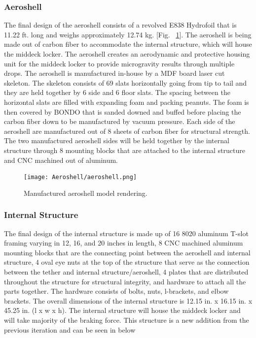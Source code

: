 \subsubsection{Aeroshell}

\indent\indent The final design of the aeroshell consists of a revolved E838 Hydrofoil that is 11.22 ft. long and weighs approximately 12.74 kg. [Fig. ~\ref{fig:aeroshell}]. The aeroshell is being made out of carbon fiber to accommodate the internal structure, which will house the middeck locker. The aeroshell creates an aerodynamic and protective housing unit for the middeck locker to provide microgravity results through multiple drops. The aeroshell is manufactured in-house by a MDF board laser cut skeleton. The skeleton consists of 69 slats horizontally going from tip to tail and they are held together by 6 side and 6 floor slats. The spacing between the horizontal slats are filled with expanding foam and packing peanuts. The foam is then covered by BONDO that is sanded downed and buffed before placing the carbon fiber down to be manufactured by vacuum pressure. Each side of the aeroshell are manufactured out of 8 sheets of carbon fiber for structural strength. The two manufactured aeroshell sides will be held together by the internal structure through 8 mounting blocks that are attached to the internal structure and CNC machined out of aluminum.

\begin{figure}[H]
  \centering
  \texttt{[image: Aeroshell/aeroshell.png]}
  \caption{\label{fig:aeroshell}Manufactured aeroshell model rendering.}
\end{figure}

\subsubsection{Internal Structure}

The final design of the internal structure is made up of 16 8020 aluminum T-slot framing varying in 12, 16, and 20 inches in length, 8 CNC machined aluminum mounting blocks that are the connecting point between the aeroshell and internal structure, 4 oval eye nuts at the top of the structure that serve as the connection between the tether and internal structure/aeroshell, 4 plates that are distributed throughout the structure for structural integrity, and hardware to attach all the parts together. The hardware consists of bolts, nuts, l-brackets, and elbow brackets. The overall dimensions of the internal structure is 12.15 in. x 16.15 in. x 45.25 in. (l x w x h). The internal structure will house the middeck locker and will take majority of the braking force. This structure is a new addition from the previous iteration and can be seen in  below

